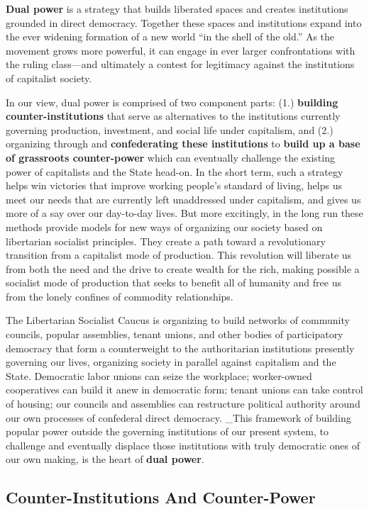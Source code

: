 \documentclass[10pt]{memoir}
\begin{document}
\textbf{Dual power} is a strategy that builds liberated spaces and
creates institutions grounded in direct democracy. Together these spaces
and institutions expand into the ever widening formation of a new world
``in the shell of the old.'' As the movement grows more powerful, it can
engage in ever larger confrontations with the ruling class---and
ultimately a contest for legitimacy against the institutions of
capitalist society.

In our view, dual power is comprised of two component parts: (1.)
\textbf{building counter-institutions} that serve as alternatives to the
institutions currently governing production, investment, and social life
under capitalism, and (2.) organizing through and \textbf{confederating
these institutions} to \textbf{build up a base of grassroots
counter-power} which can eventually challenge the existing power of
capitalists and the State head-on. In the short term, such a strategy
helps win victories that improve working people's standard of living,
helps us meet our needs that are currently left unaddressed under
capitalism, and gives us more of a say over our day-to-day lives. But
more excitingly, in the long run these methods provide models for new
ways of organizing our society based on libertarian socialist
principles. They create a path toward a revolutionary transition from a
capitalist mode of production. This revolution will liberate us from
both the need and the drive to create wealth for the rich, making
possible a socialist mode of production that seeks to benefit all of
humanity and free us from the lonely confines of commodity
relationships.

The Libertarian Socialist Caucus is organizing to build networks of
community councils, popular assemblies, tenant unions, and other bodies
of participatory democracy that form a counterweight to the
authoritarian institutions presently governing our lives, organizing
society in parallel against capitalism and the State. Democratic labor
unions can seize the workplace; worker-owned cooperatives can build it
anew in democratic form; tenant unions can take control of housing; our
councils and assemblies can restructure political authority around our
own processes of confederal direct democracy. \_This framework of
building popular power outside the governing institutions of our present
system, to challenge and eventually displace those institutions with
truly democratic ones of our own making, is the heart of \textbf{dual
power}.

\subsection{Counter-Institutions And
Counter-Power}\label{counter-institutions-and-counter-power}
\end{document}
